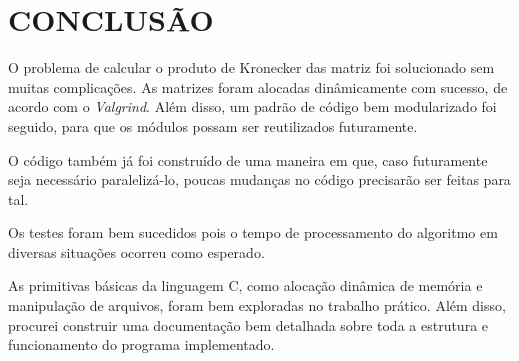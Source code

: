 \documentclass[12pt]{article}
\begin{document}
\section{CONCLUSÃO}
\label{conclusao}

	O problema de calcular o produto de Kronecker das matriz foi solucionado sem muitas complicações. As matrizes foram alocadas dinâmicamente com sucesso, de acordo com o \textit{Valgrind}. Além disso, um padrão de código bem modularizado foi seguido, para que os módulos possam ser reutilizados futuramente.

	O código também já foi construído de uma maneira em que, caso futuramente seja necessário paralelizá-lo, poucas mudanças no código precisarão ser feitas para tal.

	Os testes foram bem sucedidos pois o tempo de processamento do algoritmo em diversas situações ocorreu como esperado.

	As primitivas básicas da linguagem C, como alocação dinâmica de memória e manipulação de arquivos, foram bem exploradas no trabalho prático. Além disso, procurei construir uma documentação bem detalhada sobre toda a estrutura e funcionamento do programa implementado.



\end{document}
